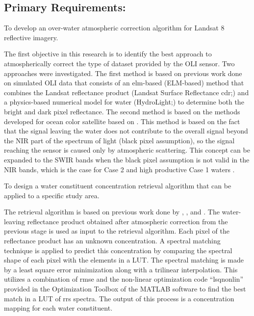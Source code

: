 \subsection{Primary Requirements:}
\begin{enumerate} 
	{\bf \item To develop an over-water atmospheric correction algorithm for Landsat 8 reflective imagery.} 

The first objective in this research is to identify the best approach to atmospherically correct the type of dataset provided by the OLI sensor. Two approaches were investigated. The first method is based on previous work done on simulated OLI data \citep{Gerace:2013,Gerace:2012,GeraceThesis,Pahlevan:2012} that consists of an \acrfull{elm}-based (ELM-based) method that combines the Landsat reflectance product (Landsat Surface Reflectance \acrshort{cdr};\citep{LandsatCDR}) and a physics-based numerical model for water (HydroLight;\citep{MobleyHEtech}) to determine both the bright and dark pixel reflectance. The second method is based on the methods developed for ocean color satellite based on \citet{Gordon:1994}. This method is based on the fact that the signal leaving the water does not contribute to the overall signal beyond the NIR part of the spectrum of light (black pixel assumption), so the signal reaching the sensor is caused only by atmospheric scattering. This concept can be expanded to the SWIR bands when the black pixel assumption is not valid in the NIR bands, which is the case for Case 2 and high productive Case 1 waters \citep{Wang:2007}.

	{\bf \item To design a water constituent concentration retrieval algorithm that can be applied to a specific study area.}

The retrieval algorithm is based on previous work done by \citet{Raqueno:2003}, \citet{GeraceThesis}, and \citet{Pahlevan:2012}. The water-leaving reflectance product obtained after atmospheric correction from the previous stage is used as input to the retrieval algorithm. Each pixel of the reflectance product has an unknown concentration. A spectral matching technique is applied to predict this concentration by comparing the spectral shape of each pixel with the elements in a LUT. The spectral matching is made by a least square error minimization along with a trilinear interpolation. This utilizes a combination of \acrfull{rmse} and the non-linear optimization code ``lsqnonlin'' provided in the Optimization Toolbox of the MATLAB software \citep{MatlabHelp} to find the best match in a LUT of \gls{rrs} spectra. The output of this process is a concentration mapping for each water constituent.


\end{enumerate}
